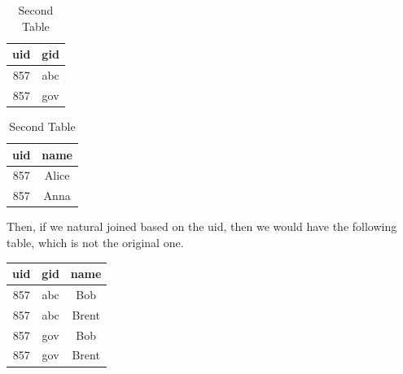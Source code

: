 \documentclass{article}
\begin{document}
\begin{example}[Lossy]
      \begin{table}[H]
        \centering
        \begin{minipage}{.5\textwidth}
          \centering
          \begin{tabular}{|c|c|}
            \hline
            \textbf{uid} & \textbf{gid} \\
            \hline
            857 & abc \\
            857 & gov \\
            \hline
          \end{tabular}
          \caption{First Table}
          \label{tab:ex2}
        \end{minipage}%
        \begin{minipage}{.5\textwidth}
          \centering
          \begin{tabular}{|c|c|}
            \hline
            \textbf{uid} & \textbf{name}\\
            \hline
            857 & Alice \\ 
            857 & Anna \\
            \hline
          \end{tabular}
          \caption{Second Table}
          \label{tab:ex3}
        \end{minipage}
      \end{table}
      Then, if we natural joined based on the uid, then we would have the following table, which is not the original one. 
      \begin{table}[H]
        \centering
        \begin{tabular}{|c|c|c|}
          \hline
          \textbf{uid} & \textbf{gid} & \textbf{name} \\
          \hline
          857 & abc & Bob \\ 
          857 & abc & Brent \\
          857 & gov & Bob \\ 
          857 & gov & Brent \\
          \hline
        \end{tabular}
        \label{tab:ex4}
      \end{table}
    \end{example}
\end{document}
